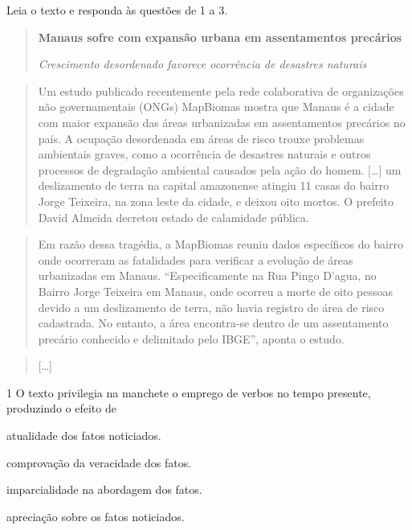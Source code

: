 Leia o texto e responda às questões de 1 a 3.

\begin{quote}
\centering\textbf{Manaus sofre com expansão urbana em assentamentos precários}

\emph{Crescimento desordenado favorece ocorrência de desastres naturais}
\end{quote}

\begin{quote}
Um estudo publicado recentemente pela rede colaborativa de organizações
não governamentais (ONGs) MapBiomas mostra que Manaus é a cidade com
maior expansão das áreas urbanizadas em assentamentos precários no país.
A ocupação desordenada em áreas de risco trouxe problemas ambientais
graves, como a ocorrência de desastres naturais e outros processos de
degradação ambiental causados pela ação do homem. {[}\ldots{]} um
deslizamento de terra na capital amazonense atingiu 11 casas do bairro
Jorge Teixeira, na zona leste da cidade, e deixou oito mortos. O
prefeito David Almeida decretou estado de calamidade pública.
\end{quote}

\begin{quote}
Em razão dessa tragédia, a MapBiomas reuniu dados específicos do bairro
onde ocorreram as fatalidades para verificar a evolução de áreas
urbanizadas em Manaus. ``Especificamente na Rua Pingo D'agua, no Bairro
Jorge Teixeira em Manaus, onde ocorreu a morte de oito pessoas devido a
um deslizamento de terra, não havia registro de área de risco
cadastrada. No entanto, a área encontra-se dentro de um assentamento
precário conhecido e delimitado pelo IBGE'', aponta o estudo.
\end{quote}

\begin{quote}
{[}\ldots{]}
\end{quote}


\num{1} O texto privilegia na manchete o emprego de verbos no tempo
presente, produzindo o efeito de

\begin{escolha}
\item atualidade dos fatos noticiados.

\item comprovação da veracidade dos fatos.

\item imparcialidade na abordagem dos fatos.

\item apreciação sobre os fatos noticiados.
\end{escolha}

